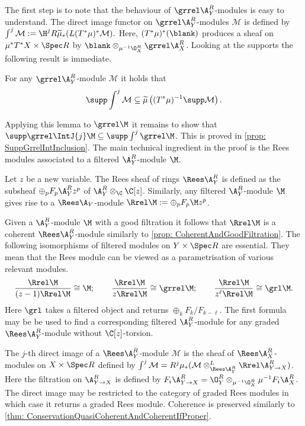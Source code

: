 The first step is to note that the behaviour of $\grrel \A_Y^R$-modules is easy to understand.
The direct image functor on $\grrel \A_Y^R$-modules $\mathcal{M}$ is defined by $\int^j \mathcal{M} :=  \H^j R \widetilde{\mu}_* ( L(T^*\mu)^*\mathcal{M}).$
Here, $(T^*\mu)^*(\blank)$ produces a sheaf on $\mu^*T^*X\times \Spec R$ by $ \blank\otimes_{\mu^{-1}\O_X^R} \grrel \A_X^R$.
Looking at the supports the following result is immediate.
\begin{lemma}\label{lem: GrKashiwara}
For any $\grrel\A_Y^R$-module $\mathcal{M}$ it holds that
$$\supp \int^j \mathcal{M}\subseteq \widetilde{\mu}\left((T^* \mu)^{-1} \supp \mathcal{M}\right).$$
\end{lemma}
Applying this lemma to $\grrel\M$ it remains to show that $\supp\grrel\IntJ{j}\M\subseteq \supp\int^j \grrel\M$. This is proved in \cref{prop: SuppGrrelIntInclusion}. The main technical ingredient in the proof is the Rees modules associated to a filtered $\A_Y^R$-module $\M$.
\begin{definition}
Let $z$ be a new variable. The Rees sheaf of rings $\Rees\A_Y^R$ is defined as the subsheaf $\oplus_p F_p \A_Y^R z^p $ of $\A_Y^R \otimes_\C \C[z]$. Similarly, any filtered $\A_Y^R$-module $\M$ gives rise to a $\Rees\A_Y$-module $\Rrel\M := \oplus_p F_p \M z^p$.
\end{definition}
Given a $\A_Y^R$-module $\M$ with a good filtration it follows that $\Rrel\M$ is a coherent $\Rees\A_Y^R$-module similarly to \cref{prop: CoherentAndGoodFiltration}.
The following isomorphisms of filtered modules on $Y\times \Spec R$ are essential.
They mean that the Rees module can be viewed as a parametrisation of various relevant modules.
$$\frac{\Rrel\M}{(z-1)\Rrel\M} \cong \M; \qquad \frac{\Rrel\M}{z\Rrel\M} \cong \grrel \M;\qquad \frac{\Rrel\M}{z^\ell\Rrel\M} \cong  \grl\M.$$
Here $\grl$ takes a filtered object and returns $\oplus_k F_{k}/F_{k-\ell}$.
The first formula may be be used to find a corresponding filtered $\A_Y^R$-module for any graded $\Rees\A_Y^R$-module without $\C[z]$-torsion.

The $j$-th direct image of a $\Rees\A_Y^R$-module $\mathcal{M}$ is the sheaf of $\Rees\A_X^R$-modules on $X\times\Spec R$ defined by $\int^j \mathcal{M} = R^j\mu_*(\mathcal{M}\otimes^L_{\Rees \A_Y^R} \Rrel \A_{Y\to X}^R)$.
Here the filtration on $\A_{Y\to X}^R$ is defined by $F_i\A_{Y\to X}^R =\O_{Y}^R \otimes_{\mu^{-1}\O_X^R}\mu^{-1}F_i\A_X^R $.
The direct image may be restricted to the category of graded Rees modules in which case it returns a graded Rees module. Coherence is preserved similarly to \cref{thm: ConservationQuasiCoherentAndCoherentIfProper}.

